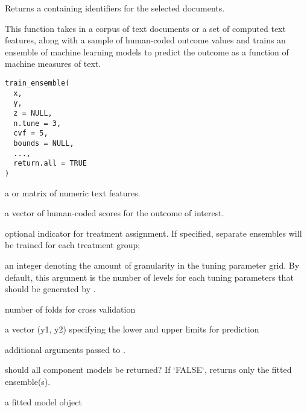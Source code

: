\documentclass[a4paper]{book}
\begin{document}
%
\begin{Value}
Returns a  containing identifiers for the selected documents.
\end{Value}
%
\begin{Description}\relax
This function takes in a corpus of text documents or a set of computed text features, along with a sample
of human-coded outcome values and trains an ensemble of machine learning models to predict the outcome as a
function of machine measures of text.
\end{Description}
%
\begin{Usage}
\begin{verbatim}
train_ensemble(
  x,
  y,
  z = NULL,
  n.tune = 3,
  cvf = 5,
  bounds = NULL,
  ...,
  return.all = TRUE
)
\end{verbatim}
\end{Usage}
%
\begin{Arguments}
\begin{ldescription}
\item[\code{x}] a  or matrix of numeric text features.

\item[\code{y}] a vector of human-coded scores for the outcome of interest.

\item[\code{z}] optional indicator for treatment assignment. If specified, separate ensembles will
be trained for each treatment group;

\item[\code{n.tune}] an integer denoting the amount of granularity in the tuning parameter grid.
By default, this argument is the number of levels for each tuning parameters that should be generated by .

\item[\code{cvf}] number of folds for cross validation

\item[\code{bounds}] a vector (y1, y2) specifying the lower and upper limits for prediction

\item[\code{...}] additional arguments passed to .

\item[\code{return.all}] should all component models be returned? If `FALSE`, returns only the fitted ensemble(s).
\end{ldescription}
\end{Arguments}
%
\begin{Value}
a fitted model object
\end{Value}
\end{document}
